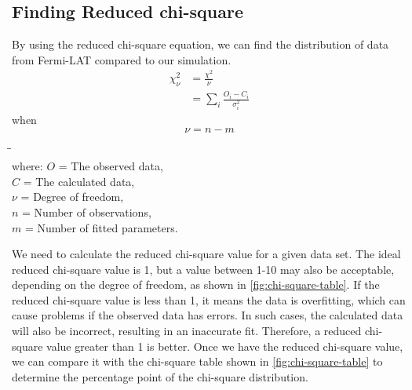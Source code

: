 \documentclass[10pt, oneside]{book}
\numberwithin{equation}{chapter}
\begin{document}
\subsection{Finding Reduced chi-square}
By using the reduced chi-square equation, we can find the distribution of data from Fermi-LAT compared to our simulation.
\begin{equation}
\begin{aligned}
    \chi_\nu^2 &= \frac{\chi^2}{\nu}\\
	&= \sum_i\frac{O_i - C_i}{\sigma_i^2}
\end{aligned}
\end{equation}
when
\begin{equation}
    \nu = n-m
    \label{degree of freedom}
\end{equation}
\begin{tabbing}
    \indent\= \indent\= \indent\=\\
    where: \>\> $O$\> = The observed data,\\
    \>\> $C$\> = The calculated data,\\
    \>\> $\nu$\> = Degree of freedom,\\
    \>\> $n$\> = Number of observations,\\
    \>\> $m$\> = Number of fitted parameters.
\end{tabbing}
We need to calculate the reduced chi-square value for a given data set. The ideal reduced chi-square value is 1, but a value between 1-10 may also be acceptable, depending on the degree of freedom, as shown in \autoref{fig:chi-square-table}. If the reduced chi-square value is less than 1, it means the data is overfitting, which can cause problems if the observed data has errors. In such cases, the calculated data will also be incorrect, resulting in an inaccurate fit. Therefore, a reduced chi-square value greater than 1 is better. Once we have the reduced chi-square value, we can compare it with the chi-square table shown in \autoref{fig:chi-square-table} to determine the percentage point of the chi-square distribution.
\end{document}
